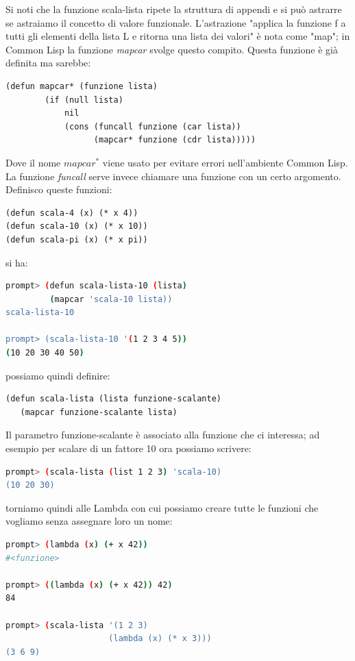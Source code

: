 \documentclass[a4paper,12pt, oneside]{book}
\begin{document}
Si noti che la funzione scala-lista ripete la struttura di appendi e si può astrarre se astraiamo il
concetto di valore funzionale. L'astrazione "applica la funzione f a tutti gli elementi della lista L e ritorna una
lista dei valori" è nota come "map"; in Common Lisp la funzione \textit{mapcar }svolge
questo compito. Questa funzione è già definita ma sarebbe:
\begin{verbatim}
(defun mapcar* (funzione lista)
        (if (null lista)
            nil
            (cons (funcall funzione (car lista))
                  (mapcar* funzione (cdr lista)))))
\end{verbatim}
Dove il nome $mapcar^*$ viene usato per evitare errori nell'ambiente Common Lisp. La funzione \textit{funcall} serve invece chiamare una funzione con un certo argomento.\\
Definisco queste funzioni:
\begin{verbatim}
(defun scala-4 (x) (* x 4))
(defun scala-10 (x) (* x 10))
(defun scala-pi (x) (* x pi))
\end{verbatim}
si ha:
\begin{shaded}
	\begin{lstlisting}[language=bash]
prompt> (defun scala-lista-10 (lista)
         (mapcar 'scala-10 lista))
scala-lista-10

prompt> (scala-lista-10 '(1 2 3 4 5))
(10 20 30 40 50)
\end{lstlisting}
\end{shaded}
possiamo quindi definire:
\begin{verbatim}
(defun scala-lista (lista funzione-scalante)
   (mapcar funzione-scalante lista)
\end{verbatim}
Il parametro funzione-scalante è associato alla funzione che ci interessa; ad esempio per scalare di un fattore 10 ora possiamo scrivere:
\begin{shaded}
	\begin{lstlisting}[language=bash]
prompt> (scala-lista (list 1 2 3) 'scala-10)
(10 20 30)
\end{lstlisting}
\end{shaded}
torniamo quindi alle Lambda con cui possiamo creare tutte le funzioni che
vogliamo senza assegnare loro un nome:
\begin{shaded}
	\begin{lstlisting}[language=bash]
prompt> (lambda (x) (+ x 42))
#<funzione>

prompt> ((lambda (x) (+ x 42)) 42)
84

prompt> (scala-lista '(1 2 3)
                     (lambda (x) (* x 3)))
(3 6 9)
\end{lstlisting}
\end{shaded}
\end{document}
